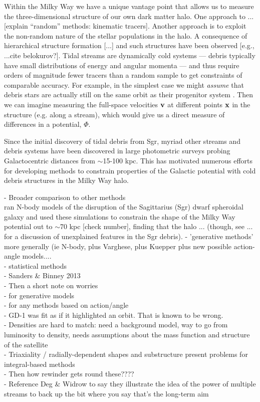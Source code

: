 \documentclass[letterpaper,12pt,preprint]{aastex}
\begin{document}
Within the Milky Way we have a unique vantage point that allows us to measure the three-dimensional structure of our own dark matter halo. One approach to ... [explain ``random'' methods: kinematic tracers]. Another approach is to exploit the non-random nature of the stellar populations in the halo. A consequence of hierarchical structure formation [...] and such structures have been observed [e.g., ...cite belokurov?]. Tidal streams are dynamically cold systems --- debris typically have small distributions of energy and angular momenta --- and thus require orders of magnitude fewer tracers than a random sample to get constraints of comparable accuracy. For example, in the simplest case we might {\it assume} that debris stars are actually still on the same orbit as their progenitor system \citep[a \emph{wrong} assumption, see e.g.][]{eyre}. Then we can imagine measuring the full-space velocities ${\bf v}$ at different points ${\bf x}$ in the structure (e.g. along a stream), which would give us a direct measure of differences in a potential, $\Phi$. 

Since the initial discovery of tidal debris from Sgr, myriad other streams and debris systems have been discovered in large photometric surveys probing Galactocentric distances from $\sim$15-100 kpc. This has motivated numerous efforts for developing methods to constrain properties of the Galactic potential with cold debris structures in the Milky Way halo. 

- Broader comparison to other methods\\
\cite[][hereafter LM10]{lm10} ran N-body models of the disruption of the Sagittarius (Sgr) dwarf spheroidal galaxy and used these simulations to constrain the shape of the Milky Way potential out to $\sim$70 kpc [check number], finding that the halo ... (though, see ... for a discussion of unexplained features in the Sgr debris).
\indent\indent- 'generative methods' more generally (ie N-body, plus Varghese, plus Kuepper plus new possible action-angle models....\\
\indent\indent- statistical methods\\
\indent\indent- Sanders \& Binney 2013\\
- Then a short note on worries\\
\indent\indent- for generative models\\
\indent\indent- for any methods based on action/angle \\
\indent\indent- GD-1 was fit as if it highlighted an orbit.  That is known to be wrong.\\
\indent\indent- Densities are hard to match: need a background model, way to go from luminosity to density, needs assumptions about the mass function and structure of the satellite\\
\indent\indent- Triaxiality / radially-dependent shapes and substructure present problems for integral-based methods\\
- Then how rewinder gets round these????\\
\indent\indent- Reference Deg \& Widrow to say they illustrate the idea of the power of multiple streams to back up the bit where you say that's the long-term aim\\
\end{document}
